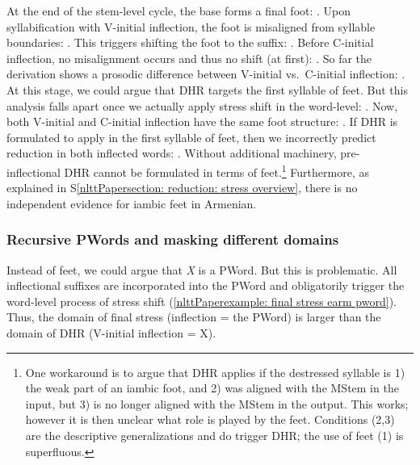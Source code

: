 At the end of the stem-level cycle, the base forms a final foot: \textit{}. Upon syllabification with V-initial inflection, the foot is misaligned from syllable boundaries: \textit{}. This triggers shifting the foot to the suffix: \textit{}. Before C-initial inflection, no misalignment occurs and thus no shift (at first): \textit{}. 
So far the derivation shows a prosodic difference between V-initial vs.\ C-initial inflection: \textit{}. At this stage, we could argue that DHR targets the first syllable of feet. But this analysis falls apart once we actually apply stress shift in the word-level: \textit{}. Now, both V-initial and C-initial inflection have the same foot structure: \textit{}. If DHR is formulated to apply in the first syllable of feet, then we incorrectly predict reduction in both inflected words: \textit{}. Without additional machinery, pre-inflectional DHR cannot be formulated in terms of feet.\footnote{One workaround is to argue that DHR applies if the destressed syllable is 1) the weak part of an iambic foot, and 2) was aligned with the MStem in the input, but 3) is no longer aligned with the MStem in the output. This works; however it is then unclear what role is played by the feet. Conditions (2,3) are the descriptive generalizations and do trigger DHR; the use of feet (1) is superfluous.} Furthermore, as explained in S\ref{nlttPapersection: reduction: stress overview}, there is no independent evidence for iambic feet in Armenian.%




\subsubsection{Recursive PWords and masking different domains}\label{nlttPapersection: reduction: destressed reduction EA: pword and feet: pword}

Instead of feet, we could argue that \textit{X} is a PWord. But this is problematic. All inflectional suffixes are incorporated into the PWord and obligatorily trigger the word-level process of stress shift (\ref{nlttPaperexample: final stress earm pword}). Thus, the domain of final stress (inflection = the PWord) is larger than the domain of DHR (V-initial inflection = X). 




